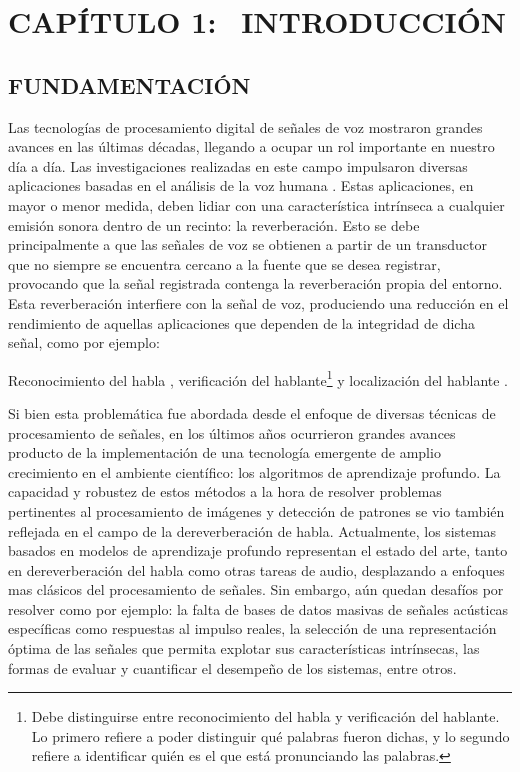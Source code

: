 \section[Introducción]{CAPÍTULO 1:$\ \ \ \ $INTRODUCCIÓN} 

\subsection[Fundamentación]{FUNDAMENTACIÓN}
Las tecnologías de procesamiento digital de señales de voz mostraron grandes avances en las últimas décadas, llegando a ocupar un rol importante en nuestro día a día. Las investigaciones realizadas en este campo impulsaron diversas aplicaciones basadas en el análisis de la voz humana \cite{fun1}\cite{fun2}. 
Estas aplicaciones, en mayor o menor medida, deben lidiar con una característica intrínseca a cualquier emisión sonora dentro de un recinto: la reverberación. Esto se debe principalmente a que las señales de voz se obtienen a partir de un transductor que no siempre se encuentra cercano a la fuente que se desea registrar, provocando que la señal registrada contenga la reverberación propia del entorno. Esta reverberación interfiere con la señal de voz, produciendo una reducción en el rendimiento de aquellas aplicaciones que dependen de la integridad de dicha señal, como por ejemplo: 

Reconocimiento del habla \cite{reconocimiento}, verificación del hablante\footnote{Debe distinguirse entre reconocimiento del habla y verificación del hablante. Lo primero refiere a poder distinguir qué palabras fueron dichas, y lo segundo refiere a identificar quién es el que está pronunciando las palabras.} \cite{verificacion} y localización del hablante \cite{localizacion}.

Si bien esta problemática fue abordada desde el enfoque de diversas técnicas de procesamiento de señales, en los últimos años ocurrieron grandes avances producto de la implementación de una tecnología emergente de amplio crecimiento en el ambiente científico: los algoritmos de aprendizaje profundo. La capacidad y robustez de estos métodos a la hora de resolver problemas pertinentes al procesamiento de imágenes y detección de patrones se vio también reflejada en el campo de la dereverberación de habla. Actualmente, los sistemas basados en modelos de aprendizaje profundo representan el estado del arte, tanto en dereverberación del habla como otras tareas de audio, desplazando a enfoques mas clásicos del procesamiento de señales. Sin embargo, aún quedan desafíos por resolver como por ejemplo: la falta de bases de datos masivas de señales acústicas específicas como respuestas al impulso reales, la selección de una representación óptima de las señales que permita explotar sus características intrínsecas, las formas de evaluar y cuantificar el desempeño de los sistemas, entre otros.

